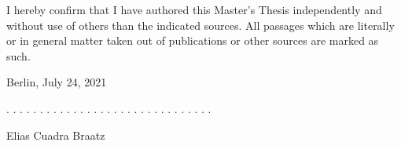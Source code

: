 \documentclass[a4paper,11pt]{article}
\newcommand{\thesistype}{Master's Thesis}
\newcommand{\thesisauthor}{Elias Cuadra Braatz}
\newcommand{\thesisdate}{July 24, 2021}
\begin{document}
I hereby confirm that I have authored this \thesistype{} independently and
without use of others than the indicated sources. All passages which are
literally or in general matter taken out of publications or other sources are
marked as such.
\vspace{1cm}

Berlin, \thesisdate{}
\vspace{3cm}

. . . . . . . . . . . . . . . . . . . . . . . . . . . . . . .
\vspace{0.1cm}

\thesisauthor{}
\end{document}
